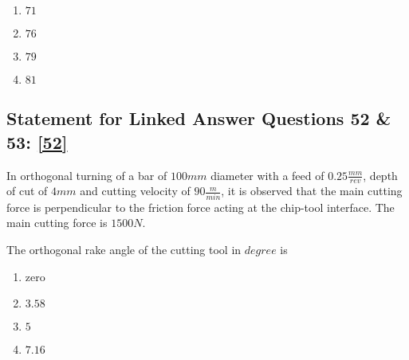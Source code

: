     \begin{multicols}{4}
        \begin{enumerate}
            \item $71$
            \item $76$
            \item $79$
            \item $81$
        \end{enumerate}
    \end{multicols}

    \subsection{Statement for Linked Answer Questions 52 \& 53: \ref{52}}
        
    In orthogonal turning of a bar of $100 mm$ diameter with a feed of $0.25 \frac{mm}{rev}$, depth of cut of $4 mm$ and cutting velocity of $90 \frac{m}{min}$, it is observed that the main  cutting force is perpendicular to the friction force acting at the chip-tool interface. The main  cutting force is $1500 N$.\\

    \item 
    The orthogonal rake angle of the cutting tool in $degree$ is \label{52}
    \hfill{}
    \begin{multicols}{4}
        \begin{enumerate}
            \item zero
            \item $3.58$
            \item $5$
            \item $7.16$
        \end{enumerate}
    \end{multicols}

